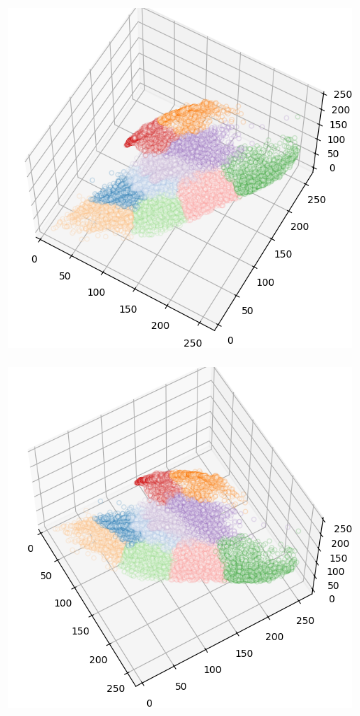 \begin{figure}[htbp]
\begin{subfigure}[t]{0.32\textwidth}
    \end{subfigure}
    \begin{subfigure}[t]{0.32\textwidth}
        \includegraphics[width=\linewidth]{../../python_code/plots/kmeans/flower-23/clusters_elev60_azim-60.png}
    \end{subfigure}
    \begin{subfigure}[t]{0.32\textwidth}
        \includegraphics[width=\linewidth]{../../python_code/plots/kmeans/flower-23/clusters_elev60_azim-30.png}

\end{subfigure}
\end{figure}
